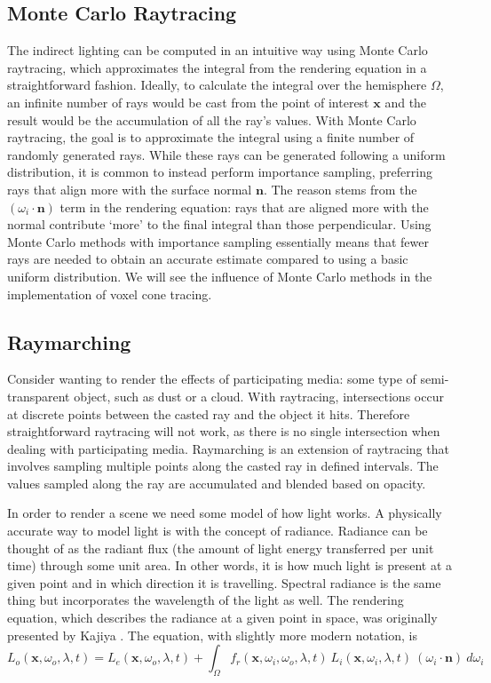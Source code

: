 \subsection{Monte Carlo Raytracing}
The indirect lighting can be computed in an intuitive way using Monte Carlo raytracing, which approximates the integral from the rendering equation in a straightforward fashion. Ideally, to calculate the integral over the hemisphere $\Omega$, an infinite number of rays would be cast from the point of interest $\bm{x}$ and the result would be the accumulation of all the ray's values. With Monte Carlo raytracing, the goal is to approximate the integral using a finite number of randomly generated rays. While these rays can be generated following a uniform distribution, it is common to instead perform importance sampling, preferring rays that align more with the surface normal $\bm{n}$. The reason stems from the $(\omega_i \cdot \bm{n})$ term in the rendering equation: rays that are aligned more with the normal contribute `more' to the final integral than those perpendicular. Using Monte Carlo methods with importance sampling essentially means that fewer rays are needed to obtain an accurate estimate compared to using a basic uniform distribution. We will see the influence of Monte Carlo methods in the implementation of voxel cone tracing.

\subsection{Raymarching}
Consider wanting to render the effects of participating media: some type of semi-transparent object, such as dust or a cloud. With raytracing, intersections occur at discrete points between the casted ray and the object it hits. Therefore straightforward raytracing will not work, as there is no single intersection when dealing with participating media. Raymarching is an extension of raytracing that involves sampling multiple points along the casted ray in defined intervals. The values sampled along the ray are accumulated and blended based on opacity.


\iffalse
In order to render a scene we need some model of how light works. A physically accurate way to model light is with the concept of radiance. Radiance can be thought of as the radiant flux (the amount of light energy transferred per unit time) through some unit area. In other words, it is how much light is present at a given point and in which direction it is travelling. Spectral radiance is the same thing but incorporates the wavelength of the light as well. The rendering equation, which describes the radiance at a given point in space, was originally presented by Kajiya \cite{kajiya1986rendering}. The equation, with slightly more modern notation, is
\begin{equation*}
    L_o(\bm{x}, \omega_o, \lambda, t) = L_e(\bm{x}, \omega_o, \lambda, t) + \int_\Omega f_r(\bm{x}, \omega_i, \omega_o, \lambda, t)\ L_i(\bm{x}, \omega_i, \lambda, t)\ (\omega_i \cdot \bm{n})\ d\omega_i
\end{equation*}

